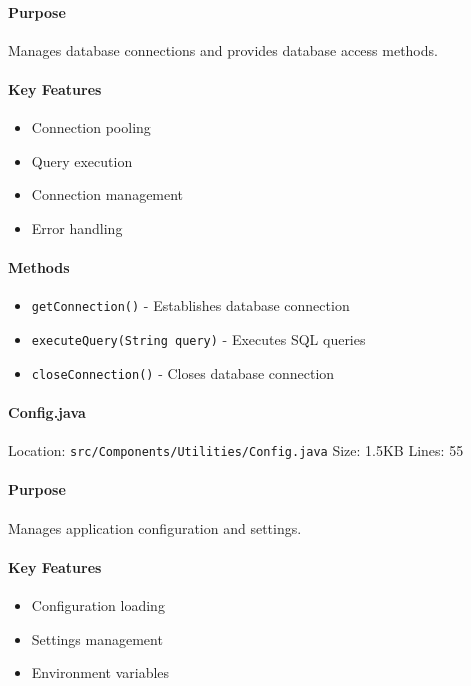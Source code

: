 \documentclass[12pt,a4paper]{article}
\begin{document}
\paragraph{Purpose}
Manages database connections and provides database access methods.

\paragraph{Key Features}
\begin{itemize}
    \item Connection pooling
    \item Query execution
    \item Connection management
    \item Error handling
\end{itemize}

\paragraph{Methods}
\begin{itemize}
    \item \texttt{getConnection()} - Establishes database connection
    \item \texttt{executeQuery(String query)} - Executes SQL queries
    \item \texttt{closeConnection()} - Closes database connection
\end{itemize}

\paragraph{Config.java}
Location: \texttt{src/Components/Utilities/Config.java}
Size: 1.5KB
Lines: 55

\paragraph{Purpose}
Manages application configuration and settings.

\paragraph{Key Features}
\begin{itemize}
    \item Configuration loading
    \item Settings management
    \item Environment variables
\end{itemize}
\end{document}
